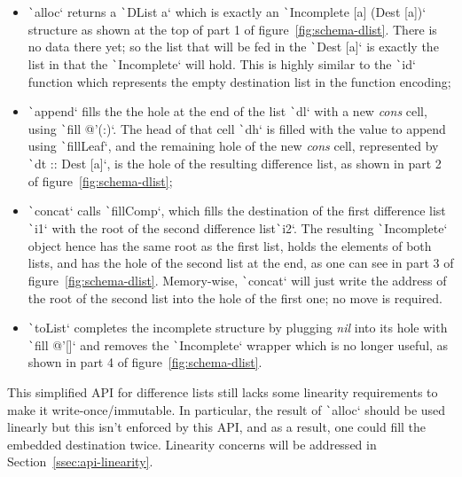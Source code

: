 \documentclass[english]{jflart}
\begin{document}
\begin{itemize}
  \item \texttt`alloc` returns a \texttt`DList a` which is exactly an \texttt`Incomplete [a] (Dest [a])` structure as shown at the top of part 1 of figure~\ref{fig:schema-dlist}. There is no data there yet; so the list that will be fed in the \texttt`Dest [a]` is exactly the list in that the \texttt`Incomplete` will hold. This is highly similar to the \texttt`id` function which represents the empty destination list in the function encoding;
  \item \texttt`append` fills the the hole at the end of the list \texttt`dl` with a new \emph{cons} cell, using \texttt`fill @'(:)`. The head of that cell \texttt`dh` is filled with the value to append using \texttt`fillLeaf`, and the remaining hole of the new \emph{cons} cell, represented by \texttt`dt :: Dest [a]`, is the hole of the resulting difference list, as shown in part 2 of figure~\ref{fig:schema-dlist};
  \item \texttt`concat` calls \texttt`fillComp`, which fills the destination of the first difference list \texttt`i1` with the root of the second difference list\texttt`i2`. The resulting \texttt`Incomplete` object hence has the same root as the first list, holds the elements of both lists, and has the hole of the second list at the end, as one can see in part 3 of figure~\ref{fig:schema-dlist}. Memory-wise, \texttt`concat` will just write the address of the root of the second list into the hole of the first one; no move is required.
  \item \texttt`toList` completes the incomplete structure by plugging \emph{nil} into its hole with \texttt`fill @'[]` and removes the \texttt`Incomplete` wrapper which is no longer useful, as shown in part 4 of figure~\ref{fig:schema-dlist}.
\end{itemize}

This simplified API for difference lists still lacks some linearity requirements to make it write-once/immutable. In particular, the result of \texttt`alloc` should be used linearly but this isn't enforced by this API, and as a result, one could fill the embedded destination twice. Linearity concerns will be addressed in Section~\ref{ssec:api-linearity}.
\end{document}
